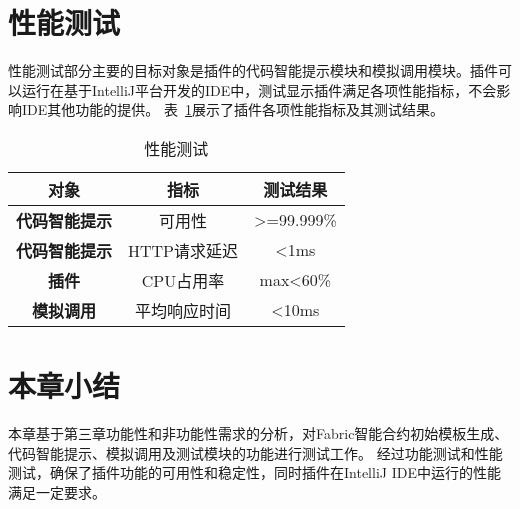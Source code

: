 \section{性能测试}

性能测试部分主要的目标对象是插件的代码智能提示模块和模拟调用模块。插件可以运行在基于IntelliJ平台开发的IDE中，测试显示插件满足各项性能指标，不会影响IDE其他功能的提供。
表~\ref{table:test}展示了插件各项性能指标及其测试结果。

\begin{table}[htb]\scriptsize
\centering
\caption{性能测试}
\vspace{2mm}
\begin{tabular}{ccc}
\toprule
\textbf{对象}&\textbf{指标}&\textbf{测试结果}\\
\midrule
\textbf{代码智能提示}&可用性&>=99.999\%\\ \hline
\textbf{代码智能提示}&HTTP请求延迟&<1ms\\ \hline
\textbf{插件}&CPU占用率&max<60\%\\ \hline
\textbf{模拟调用}&平均响应时间&<10ms\\
\bottomrule
\end{tabular}
\label{table:test}
\end{table}

\section{本章小结}

本章基于第三章功能性和非功能性需求的分析，对Fabric智能合约初始模板生成、代码智能提示、模拟调用及测试模块的功能进行测试工作。
经过功能测试和性能测试，确保了插件功能的可用性和稳定性，同时插件在IntelliJ IDE中运行的性能满足一定要求。